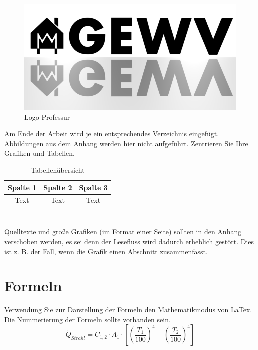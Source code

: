 \begin{figure} [h]
\centering
\includegraphics[scale=0.6]{images/Abbildung1.png}
\caption{Logo Professur}
\end{figure}

Am Ende der Arbeit wird je ein entsprechendes Verzeichnis eingefügt. Abbildungen aus dem Anhang werden hier nicht aufgeführt. Zentrieren Sie Ihre Grafiken und Tabellen.
\\
\begin{table} [h]
\begin{center}
\caption{Tabellenübersicht}
\begin{tabular}{|c|c|c|}
\hline 
Spalte 1 & Spalte 2 & Spalte 3 \\
\hline
Text & Text & Text \\
\hline
 & & \\
\hline
\end{tabular}
\end{center}
\end{table}
\\

Quelltexte und große Grafiken (im Format einer Seite) sollten in den Anhang verschoben werden, es sei denn der Lesefluss wird dadurch erheblich gestört. Dies ist z. B. der Fall, wenn die Grafik einen Abschnitt zusammenfasst. 

\section{Formeln}
Verwendung Sie zur Darstellung der Formeln den Mathematikmodus von LaTex. Die Nummerierung der Formeln sollte vorhanden sein.\\

\begin{equation} 
\dot{Q}_{Strahl} = C_{1,2} \cdot A_{1} \cdot \left[\left(\frac{T_{1}}{100}\right)^{4} - \left(\frac{T_{2}}{100}\right)^{4}\right]
\end{equation} 

